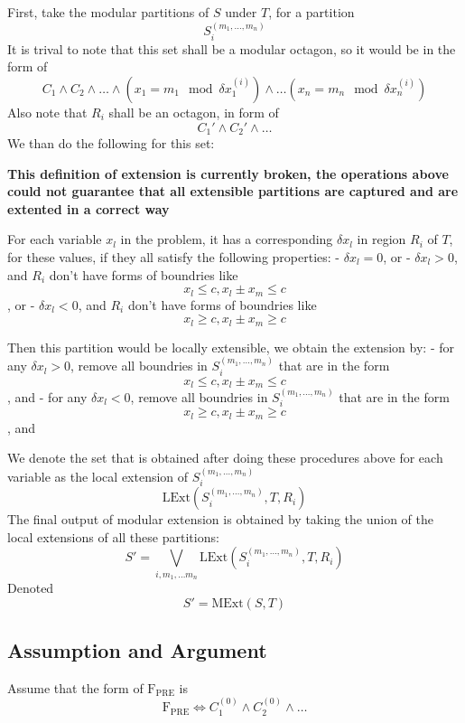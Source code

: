 \documentclass[letterpaper,]{article}
\begin{document}
\begin{description}
First, take the modular partitions of \(S\) under \(T\), for a partition
\[S_i^{(m_1, \dots, m_n)} \] It is trival to note that this set shall be
a modular octagon, so it would be in the form of
\[C_1 \land C_2 \land \dots \land (x_1 = m_1 \mod \delta x_1^{(i)}) \land \dots (x_n = m_n \mod \delta x_n^{(i)})\]
Also note that \(R_i\) shall be an octagon, in form of
\[C_1'\land C_2' \land \dots \] We than do the following for this set:

\textbf{This definition of extension is currently broken, the operations
above could not guarantee that all extensible partitions are captured
and are extented in a correct way}

For each variable \(x_l\) in the problem, it has a corresponding
\(\delta x_l\) in region \(R_i\) of \(T\), for these values, if they all
satisfy the following properties: - \(\delta x_l = 0\), or -
\(\delta x_l > 0\), and \(R_i\) don't have forms of boundries like
\[ x_l \le c, x_l \pm x_m \le c\], or - \(\delta x_l < 0\), and \(R_i\)
don't have forms of boundries like \[ x_l \ge c, x_l \pm x_m \ge c\]

Then this partition would be locally extensible, we obtain the extension
by: - for any \(\delta x_l > 0\), remove all boundries in
\(S_i^{(m_1, \dots, m_n)}\) that are in the form
\[ x_l \le c, x_l \pm x_m \le c\], and - for any \(\delta x_l < 0\),
remove all boundries in \(S_i^{(m_1, \dots, m_n)}\) that are in the form
\[ x_l \ge c, x_l \pm x_m \ge c\], and

We denote the set that is obtained after doing these procedures above
for each variable as the local extension of \(S_i^{(m_1, \dots, m_n)}\)
\[\mathrm{LExt}(S_i^{(m_1, \dots, m_n)}, T, R_i)  \] The final output of
modular extension is obtained by taking the union of the local
extensions of all these partitions:
\[S' = \bigvee_{i, m_1, \dots m_n} \mathrm{LExt}(S_i^{(m_1, \dots, m_n)}, T, R_i)\]
Denoted \[S' = \mathrm{MExt}(S, T)\]
\end{description}

\hypertarget{assumption-and-argument-1}{%
\subsection{Assumption and Argument}\label{assumption-and-argument-1}}

Assume that the form of \(\mathrm{F_{PRE}}\) is
\[\mathrm{F_{PRE}}\Leftrightarrow C_1^{(0)}\land C_2^{(0)}\land\dots\]
\end{document}
